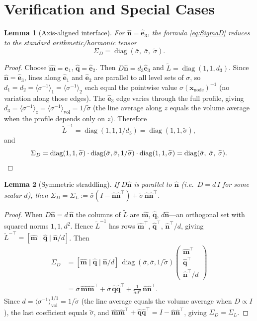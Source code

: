 \documentclass[11pt]{article}
\newtheorem{lemma}{Lemma}
\newcommand{\nn}{\hat{\bm{n}}}
\newcommand{\mm}{\hat{\bm{m}}}
\newcommand{\qq}{\hat{\bm{q}}}
\newcommand{\ee}[1]{\hat{\bm{e}}_{#1}}
\newcommand{\tL}{\widetilde{L}}
\newcommand{\SD}{\Sigma_D}
\newcommand{\SL}{\Sigma_L}
\newcommand{\sbar}{\bar{\sigma}}
\newcommand{\stilde}{\widetilde{\sigma}}
\newcommand{\invs}{\langle\sigma^{-1}\rangle_{\mathrm{vol}}}
\begin{document}
\section{Verification and Special Cases}

\begin{lemma}[Axis-aligned interface]\label{lem:axis}
For $\nn = \ee{3}$, the formula \eqref{eq:SigmaD} reduces to the standard
arithmetic/harmonic tensor
\[
    \SD = \operatorname{diag}(\sbar,\;\sbar,\;\stilde).
\]
\end{lemma}
\begin{proof}
Choose $\mm=\ee{1}$, $\qq=\ee{2}$.  Then $D\nn = d_3\ee{3}$ and
$\tL = \operatorname{diag}(1,1,d_3)$.  Since $\nn = \ee{3}$, lines along
$\ee{1}$ and $\ee{2}$ are parallel to all level sets of $\sigma$, so
$d_1 = d_2 = \langle\sigma^{-1}\rangle_1 = \langle\sigma^{-1}\rangle_2$
each equal the pointwise value $\sigma(\bm{x}_{\mathrm{node}})^{-1}$ (no
variation along those edges).  The $\ee{3}$ edge varies through the full
profile, giving $d_3 = \langle\sigma^{-1}\rangle_z = \invs = 1/\stilde$
(the line average along $z$ equals the volume average when the profile
depends only on $z$).  Therefore
\[
    \tL^{-1} = \operatorname{diag}(1,1,1/d_3) = \operatorname{diag}(1,1,\stilde),
\]
and
\[
    \SD = \operatorname{diag}(1,1,\stilde)\cdot
          \operatorname{diag}(\sbar,\sbar,1/\stilde)\cdot
          \operatorname{diag}(1,1,\stilde)
        = \operatorname{diag}(\sbar,\;\sbar,\;\stilde).\qedhere
\]
\end{proof}

\begin{lemma}[Symmetric straddling]\label{lem:sym}
If $D\nn$ is parallel to $\nn$ (i.e.\ $D = d\,I$ for some scalar $d$), then
$\SD = \SL := \sbar(I - \nn\nn^\top) + \stilde\,\nn\nn^\top$.
\end{lemma}
\begin{proof}
When $D\nn = d\,\nn$ the columns of $\tL$ are $\mm$, $\qq$, $d\nn$---an
orthogonal set with squared norms $1,1,d^2$.  Hence
$\tL^{-1}$ has rows $\mm^\top$, $\qq^\top$, $\nn^\top/d$, giving
$\tL^{-\top} = [\mm\mid\qq\mid\nn/d]$.  Then
\begin{align*}
    \SD &= [\mm\mid\qq\mid\nn/d]\,\operatorname{diag}(\sbar,\sbar,1/\stilde)
           \begin{pmatrix}\mm^\top\\\qq^\top\\\nn^\top/d\end{pmatrix}
    \\
    &= \sbar\,\mm\mm^\top + \sbar\,\qq\qq^\top + \frac{1}{\stilde d^2}\,\nn\nn^\top.
\end{align*}
Since $d = \invs^{1/1} = 1/\stilde$ (the line average equals the volume average
when $D\propto I$), the last coefficient equals $\stilde$, and
$\mm\mm^\top + \qq\qq^\top = I - \nn\nn^\top$, giving $\SD = \SL$.
\end{proof}
\end{document}
